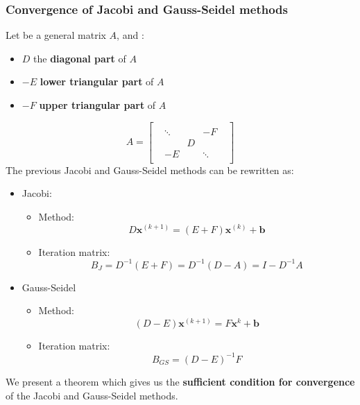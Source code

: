 \subsubsection{Convergence of Jacobi and Gauss-Seidel methods}

Let be a general matrix $A$, and :
\begin{itemize}
    \item $D$ the \textbf{diagonal part} of $A$
    \item $-E$ \textbf{lower triangular part} of $A$
    \item $-F$ \textbf{upper triangular part} of $A$
\end{itemize}
\begin{equation*}
    A = \begin{bmatrix}
        & & & & \\
        & \ddots &   & -F     & \\
        &        & D &        & \\
        & -E     &   & \ddots & \\
        & & & &
    \end{bmatrix}
\end{equation*}
The previous Jacobi and Gauss-Seidel methods can be rewritten as:
\begin{itemize}
    \item Jacobi:
    \begin{itemize}
        \item Method:
        \begin{equation*}
            D\mathbf{x}^{\left(k+1\right)} = \left(E+F\right)\mathbf{x}^{\left(k\right)} + \mathbf{b}
        \end{equation*}
        \item Iteration matrix:
        \begin{equation*}
            B_{J} = D^{-1}\left(E+F\right) = D^{-1}\left(D-A\right) = I-D^{-1}A
        \end{equation*}
    \end{itemize}

    \item Gauss-Seidel
    \begin{itemize}
        \item Method:
        \begin{equation*}
            \left(D-E\right)\mathbf{x}^{\left(k+1\right)} = F\mathbf{x}^{k} + \mathbf{b}
        \end{equation*}
        \item Iteration matrix:
        \begin{equation*}
            B_{GS} = \left(D-E\right)^{-1}F
        \end{equation*}
    \end{itemize}
\end{itemize}
We present a theorem which gives us the \textbf{sufficient condition for convergence} of the Jacobi and Gauss-Seidel methods.

